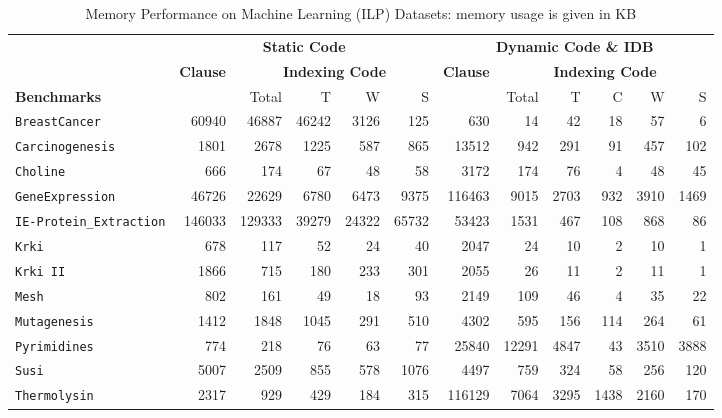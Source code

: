\documentclass{llncs}
\begin{document}
\begin{table*}[ht]
  \centering
  \begin {tabular}{|l|r|r|r|r|r||r|r|r|r|r|r|} \hline %
    &  \multicolumn{5}{|c||}{\bf Static Code}  & \multicolumn{6}{|c|}{\bf Dynamic Code \& IDB} \\
    &  \textbf{Clause} & \multicolumn{4}{|c||}{\bf Indexing Code}  & \textbf{Clause} & \multicolumn{5}{|c|}{\bf Indexing Code} \\
    \textbf{Benchmarks} &   & Total & T & W & S &  & Total & T & C & W & S  \\
    \hline
    \texttt{BreastCancer}      & 60940 & 46887 & 46242 &
    3126 & 125  & 630 & 14 &42 & 18& 57 &6 \\

    \texttt{Carcinogenesis}    & 1801 & 2678
    &1225 & 587 & 865  & 13512 & 942     & 291 & 91 & 457 & 102
 \\

    \texttt{Choline}  & 666 & 174
    &67 & 48 & 58 & 3172 & 174
    & 76 & 4 & 48 & 45
 \\
    \texttt{GeneExpression}    &  46726 & 22629
    &6780 & 6473 & 9375 & 116463 & 9015
    & 2703 & 932 & 3910 & 1469
 \\

    \texttt{IE-Protein\_Extraction}    &146033 & 129333
    &39279 & 24322 & 65732 & 53423 & 1531
    & 467 & 108 & 868 & 86
 \\

    \texttt{Krki}              & 678 & 117
    &52 & 24 & 40 & 2047 & 24
    & 10 & 2 & 10 & 1
 \\

    \texttt{Krki II}           & 1866 & 715
    &180 & 233 & 301 & 2055 & 26
    & 11 & 2 & 11 & 1
 \\

    \texttt{Mesh}              & 802 & 161
    &49 & 18 & 93 & 2149 & 109
    & 46 & 4 & 35 & 22
 \\

    \texttt{Mutagenesis}       & 1412 & 1848
    &1045 & 291 & 510 & 4302 & 595
    & 156 & 114 & 264 & 61
 \\

    \texttt{Pyrimidines}       & 774 & 218
    &76 & 63 & 77 & 25840 & 12291
    & 4847 & 43 & 3510 & 3888
 \\

    \texttt{Susi}              & 5007 & 2509
    &855 & 578 & 1076 & 4497 & 759
    & 324 & 58 & 256 & 120
 \\

    \texttt{Thermolysin}       & 2317 & 929
    &429 & 184 & 315 & 116129 & 7064
    & 3295 & 1438 & 2160 & 170
 \\

    \hline
\end{tabular}
\caption{Memory Performance on Machine Learning (ILP) Datasets: memory
  usage is given in KB}
\label{tab:ilpmem}
\end{table*}
\end{document}

